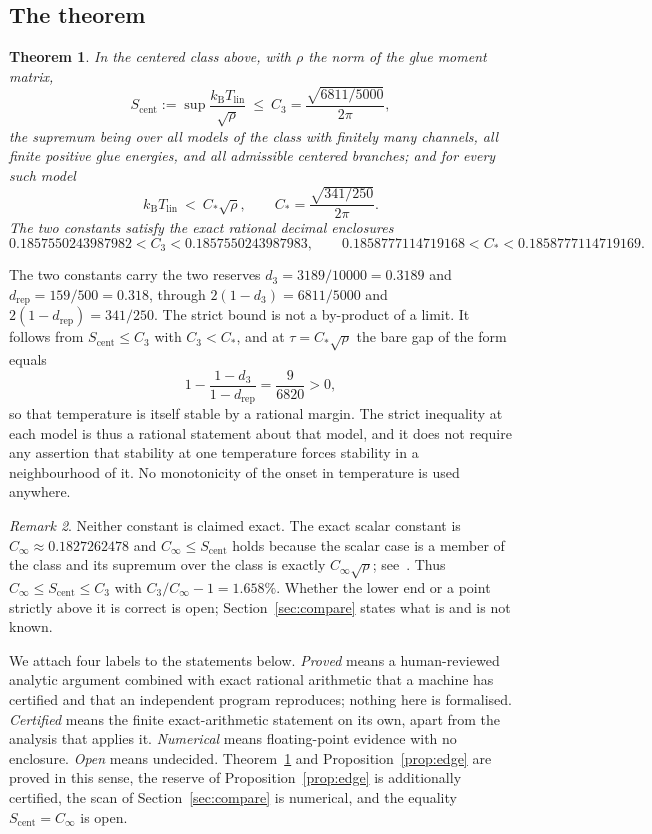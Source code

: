 \documentclass[10pt]{article}
\newtheorem{theorem}{Theorem}
\theoremstyle{remark}
\newtheorem{remark}[theorem]{Remark}
\newcommand{\kB}{k_{\mathrm B}}
\newcommand{\Tlin}{T_{\mathrm{lin}}}
\newcommand{\Cinf}{C_\infty}
\newcommand{\Cstar}{C_{*}}
\newcommand{\Cthree}{C_{3}}
\newcommand{\dthree}{d_{3}}
\newcommand{\drep}{d_{\mathrm{rep}}}
\begin{document}
\subsection{The theorem}

\begin{theorem}\label{thm:main}
In the centered class above, with $\rho$ the norm of the glue moment matrix,
\[
S_{\mathrm{cent}}:=\sup\frac{\kB\Tlin}{\sqrt{\rho}}\ \le\ \Cthree=\frac{\sqrt{6811/5000}}{2\pi},
\]
the supremum being over all models of the class with finitely many channels, all finite positive glue energies, and all admissible centered branches; and for every such model
\[
\kB\Tlin\ <\ \Cstar\sqrt{\rho},\qquad \Cstar=\frac{\sqrt{341/250}}{2\pi}.
\]
The two constants satisfy the exact rational decimal enclosures
\[
0.1857550243987982<\Cthree<0.1857550243987983,\qquad
0.1858777114719168<\Cstar<0.1858777114719169 .
\]
\end{theorem}

The two constants carry the two reserves $\dthree=3189/10000=0.3189$ and $\drep=159/500=0.318$, through $2(1-\dthree)=6811/5000$ and $2(1-\drep)=341/250$. The strict bound is not a by-product of a limit. It follows from $S_{\mathrm{cent}}\le\Cthree$ with $\Cthree<\Cstar$, and at $\tau=\Cstar\sqrt\rho$ the bare gap of the form equals
\begin{equation}\label{eq:baregap}
1-\frac{1-\dthree}{1-\drep}=\frac{9}{6820}>0 ,
\end{equation}
so that temperature is itself stable by a rational margin. The strict inequality at each model is thus a rational statement about that model, and it does not require any assertion that stability at one temperature forces stability in a neighbourhood of it. No monotonicity of the onset in temperature is used anywhere.

\begin{remark}\label{rem:notsharp}
Neither constant is claimed exact. The exact scalar constant is $\Cinf\approx0.1827262478$ and $\Cinf\le S_{\mathrm{cent}}$ holds because the scalar case is a member of the class and its supremum over the class is exactly $\Cinf\sqrt\rho$; see~\cite{finite,predecessor}. Thus $\Cinf\le S_{\mathrm{cent}}\le\Cthree$ with $\Cthree/\Cinf-1=1.658\%$. Whether the lower end or a point strictly above it is correct is open; Section~\ref{sec:compare} states what is and is not known.
\end{remark}

We attach four labels to the statements below. \emph{Proved} means a human-reviewed analytic argument combined with exact rational arithmetic that a machine has certified and that an independent program reproduces; nothing here is formalised. \emph{Certified} means the finite exact-arithmetic statement on its own, apart from the analysis that applies it. \emph{Numerical} means floating-point evidence with no enclosure. \emph{Open} means undecided. Theorem~\ref{thm:main} and Proposition~\ref{prop:edge} are proved in this sense, the reserve of Proposition~\ref{prop:edge} is additionally certified, the scan of Section~\ref{sec:compare} is numerical, and the equality $S_{\mathrm{cent}}=\Cinf$ is open.
\end{document}
